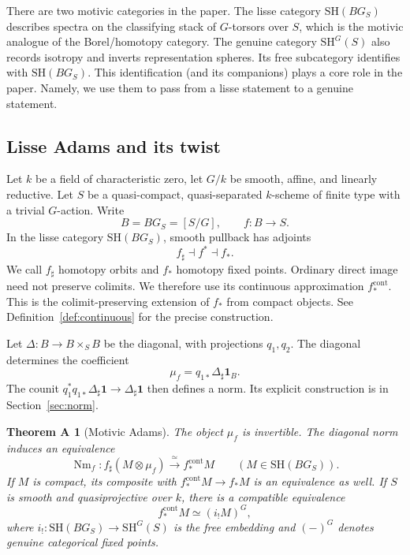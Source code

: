 \documentclass[11pt,reqno]{amsart}
\theoremstyle{definition}
\theoremstyle{remark}
\theoremstyle{plain}
\newtheorem*{maintheorem}{Theorem A}
\numberwithin{equation}{section}
\newcommand{\SH}{\mathrm{SH}}
\newcommand{\one}{\mathbf 1}
\newcommand{\Nm}{\operatorname{Nm}}
\newcommand{\cont}{\mathrm{cont}}
\begin{document}
There are two motivic categories in the paper.
The lisse category \(\SH(BG_S)\) describes spectra on the classifying
stack of \(G\)-torsors over \(S\), which is the motivic analogue of the Borel/homotopy category.
The genuine category \(\SH^G(S)\) also records isotropy and inverts
representation spheres.
Its free subcategory identifies with \(\SH(BG_S)\).
This identification (and its companions) plays a core role in the paper.
Namely, we use them to pass from a lisse statement to a genuine statement.  

\subsection{Lisse Adams and its twist}

Let \(k\) be a field of characteristic zero, let \(G/k\) be smooth,
affine, and linearly reductive.
Let \(S\) be a quasi-compact,
quasi-separated \(k\)-scheme of finite type with a trivial \(G\)-action.
Write
\[
 B=BG_S=[S/G],\qquad f:B\longrightarrow S.
\]
In the lisse category \( \SH(BG_S) \), smooth pullback has adjoints
\[
 f_\sharp\dashv f^*\dashv f_*.
\]
We call \(f_\sharp\) homotopy orbits and \(f_*\) homotopy fixed points.
Ordinary direct image need not preserve colimits.
We therefore use its continuous approximation \(f_*^{\cont}\).
This is the colimit-preserving extension of \(f_*\) from compact objects.
See Definition~\ref{def:continuous} for the precise construction.

Let \(\Delta:B\to B\times_S B\) be the diagonal, with projections
\(q_1,q_2\). The diagonal determines the coefficient
\begin{equation}\label{eq:intro-mu}
 \mu_f=q_{1*}\Delta_\sharp\one_B.
\end{equation}
The counit \(q_1^*q_{1*}\Delta_\sharp\one\to\Delta_\sharp\one\)
then defines a norm. Its explicit construction is in
Section~\ref{sec:norm}.

\begin{maintheorem}[Motivic Adams]
The object \(\mu_f\) is invertible. The diagonal norm induces an equivalence
\[
 \Nm_f:f_\sharp(M\otimes\mu_f)
       \xrightarrow{\ \simeq\ }f_*^{\cont}M
 \qquad(M\in\SH(BG_S)).
\]
If \(M\) is compact, its composite with \(f_*^{\cont}M\to f_*M\)
is an equivalence as well.
If \(S\) is smooth and quasiprojective over \(k\), there is a compatible
equivalence
\[
 f_*^{\cont}M\simeq(i_!M)^G,
\]
where \(i_!:\SH(BG_S)\to\SH^G(S)\) is the free embedding and
\((-)^G\) denotes genuine categorical fixed points.
\end{maintheorem}
\end{document}
